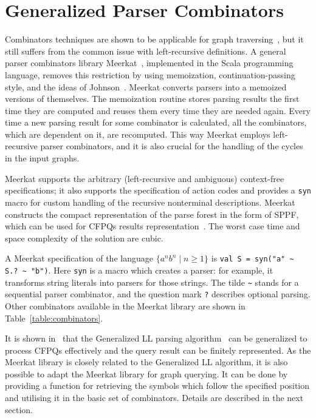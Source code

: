 \section{Generalized Parser Combinators}
\label{sec:GLL}

Combinators techniques are shown to be applicable for graph traversing~\cite{ScalaGraphParsing}, but it still suffers from the common issue with left-recursive definitions.
A general parser combinators library Meerkat~\cite{Meerkat}, implemented in the Scala programming language, removes this restriction by using memoization, continuation-passing style, and the ideas of Johnson~\cite{Johnson}.
Meerkat converts parsers into a memoized versions of themselves.
The memoization routine stores parsing results the first time they are computed and reuses them every time they are needed again.
Every time a new parsing result for some combinator is calculated, all the combinators, which are dependent on it, are recomputed.
This way Meerkat employs left-recursive parser combinators, and it is also crucial for the handling of the cycles in the input graphs.

Meerkat supports the arbitrary (left-recursive and ambiguous) context-free specifications; it also supports the specification of action codes and provides a \lstinline{syn} macro for custom handling of the recursive nonterminal descriptions.
Meerkat constructs the compact representation of the parse forest in the form of SPPF, which can be used for CFPQs results representation~\cite{GrigorevR16}.
The worst case time and space complexity of the solution are cubic.

A Meerkat specification of the language $\{a^n b^n \mid n \geq 1\}$ is \lstinline{val S = syn("a" ~ S.? ~ "b")}. Here \lstinline{syn} is a macro which creates a parser: for example, it transforms string literals into parsers for those strings. The tilde \lstinline{~} stands for a sequential parser combinator, and the question mark \lstinline{?} describes optional parsing. Other combinators available in the Meerkat library are shown in Table~\ref{table:combinators}.

It is shown in~\cite{GrigorevR16} that the Generalized LL parsing algorithm~\cite{scott2010gll} can be generalized to process CFPQs effectively and the query result can be finitely represented.
As the Meerkat library is closely related to the Generalized LL algorithm, it is also possible to adapt the Meerkat library for graph querying.
It can be done by providing a function for retrieving the symbols which follow the specified position and utilising it in the basic set of combinators.
Details are described in the next section.

